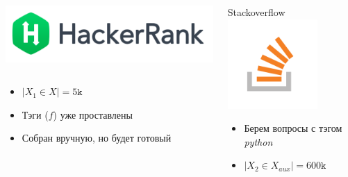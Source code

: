 \documentclass[10pt]{beamer}
\begin{document}
\begin{frame}
\begin{columns}[T]
\begin{column}[T]{0.33\textwidth}
\begin{center}
\begin{columns}
\begin{column}{0.65\textwidth}
\begin{center}
                        \includegraphics[width=\textwidth]{images/hackerank.png}
                    \end{center}
                \end{column}
            \end{columns}
            \begin{itemize}
                \item $|X_1 \in X| = 5\texttt{k}$
                \item Тэги ($f$) уже проставлены
                \item Собран вручную, но будет готовый
            \end{itemize}
        \end{center}
    \end{column}
    \vline
    \begin{column}[T]{0.33\textwidth}
        \begin{center}
            Stackoverflow \\
            \includegraphics[width=0.7\textwidth]{images/stackoverflow.png} \\
            \begin{itemize}
                \item Берем вопросы с тэгом \textit{python}
                \item $|X_2 \in X_{aux}| = 600\texttt{k}$

\end{itemize}
\end{center}
\end{column}
\end{columns}
\end{frame}
\end{document}
